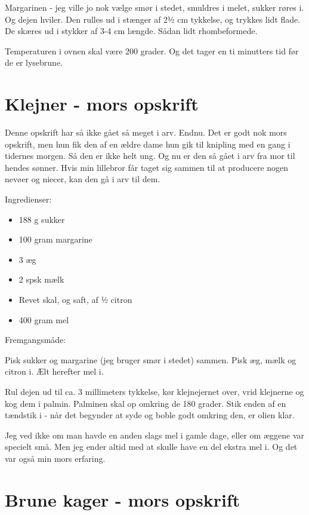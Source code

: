 \documentclass[
  letterpaper,
  DIV=11,
  numbers=noendperiod]{scrreprt}
\providecommand{\tightlist}{%
  \setlength{\itemsep}{0pt}\setlength{\parskip}{0pt}}\usepackage{longtable,booktabs,array}
\begin{document}
Margarinen - jeg ville jo nok vælge smør i stedet, smuldres i melet,
sukker røres i. Og dejen hviler. Den rulles ud i stænger af 2½ cm
tykkelse, og trykkes lidt flade. De skæres ud i stykker af 3-4 cm
længde. Sådan lidt rhombeformede.

Temperaturen i ovnen skal være 200 grader. Og det tager en ti minutters
tid før de er lysebrune.

\hypertarget{klejner---mors-opskrift}{%
\section{Klejner - mors opskrift}\label{klejner---mors-opskrift}}

Denne opskrift har så ikke gået så meget i arv. Endnu. Det er godt nok
mors opskrift, men hun fik den af en ældre dame hun gik til knipling med
en gang i tidernes morgen. Så den er ikke helt ung. Og nu er den så gået
i arv fra mor til hendes sønner. Hvis min lillebror får taget sig sammen
til at producere nogen nevøer og niecer, kan den gå i arv til dem.

Ingredienser:

\begin{itemize}
\tightlist
\item
  188 g sukker
\item
  100 gram margarine
\item
  3 æg
\item
  2 spsk mælk
\item
  Revet skal, og saft, af ½ citron
\item
  400 gram mel
\end{itemize}

Fremgangsmåde:

Pisk sukker og margarine (jeg bruger smør i stedet) sammen. Pisk æg,
mælk og citron i. Ælt herefter mel i.

Rul dejen ud til ca. 3 millimeters tykkelse, kør klejnejernet over, vrid
klejnerne og kog dem i palmin. Palminen skal op omkring de 180 grader.
Stik enden af en tændstik i - når det begynder at syde og boble godt
omkring den, er olien klar.

Jeg ved ikke om man havde en anden slags mel i gamle dage, eller om
æggene var specielt små. Men jeg ender altid med at skulle have en del
ekstra mel i. Og det var også min mors erfaring.

\hypertarget{brune-kager---mors-opskrift}{%
\section{Brune kager - mors
opskrift}\label{brune-kager---mors-opskrift}}
\end{document}

